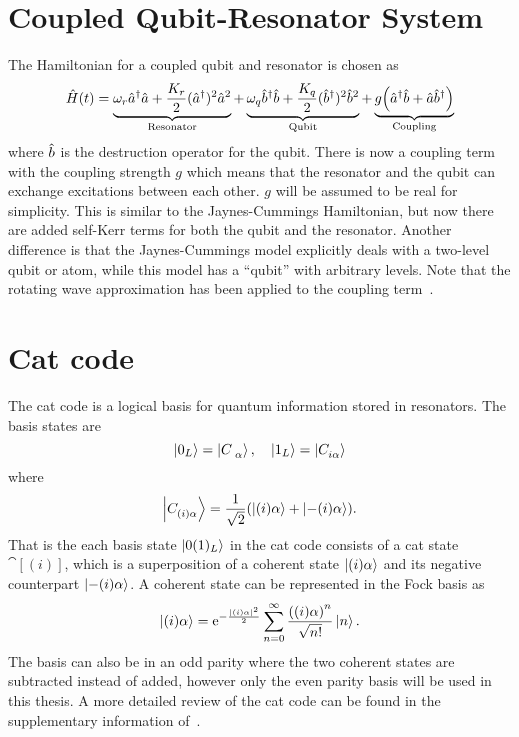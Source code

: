 \documentclass[main.tex]{subfiles}
\begin{document}
\section{Coupled Qubit-Resonator System}
The Hamiltonian for a coupled qubit and resonator is chosen as
\begin{equation}
    \Ham(t) = \underbrace{\omega_{r}\au\ad + \frac{K_r}{2}(\au)^2\ad^2}_{\text{Resonator}} + \underbrace{\omega_{q}\bu\bd + \frac{K_q}{2}(\bu)^2\bd^2}_{\text{Qubit}} + \underbrace{g\qty(\au\bd+\ad\bu)}_{\text{Coupling}}
    \label{eq:hamiltonian-coupled}
\end{equation}
where \( \bd \) is the destruction operator for the qubit.
There is now a coupling term with the coupling strength \(g\) which means that the resonator and the qubit can exchange excitations between each other.
\(g\) will be assumed to be real for simplicity.
This is similar to the Jaynes-Cummings Hamiltonian, but now there are added self-Kerr terms for both the qubit and the resonator.
Another difference is that the Jaynes-Cummings model explicitly deals with a two-level qubit or atom, while this model has a ``qubit'' with arbitrary levels.
Note that the rotating wave approximation has been applied to the coupling term~\cite{wu_strong-coupling_2007}.

\section{Cat code}
\label{sec:cat-code}
The cat code is a logical basis for quantum information stored in resonators.
The basis states are
\begin{equation}
    \ket{0_L} = \cat{},\quad \ket{1_L} = \cat[i]{}
\end{equation}
where 
\begin{equation}
    \cat[(i)]{} = \frac{1}{\sqrt{2}}\qty(\ket{(i)\alpha} + \ket{-(i)\alpha}).
\end{equation}
That is the each basis state \( \ket{0(1)_L} \) in the cat code consists of a cat state \(\cat[(i)]{}\), which is a superposition of a coherent state \(\ket{(i)\alpha}\) and its negative counterpart \(\ket{-(i)\alpha}\).
A coherent state can be represented in the Fock basis as
\begin{equation}
    \ket{(i)\alpha} =\ex^{-{\frac{|(i)\alpha|^2}{2}}}\sum_{n=0}^{\infty}{\frac{\qty((i)\alpha)^n}{\sqrt{n!}}}\ket{n}.
\end{equation}
The basis can also be in an odd parity where the two coherent states are subtracted instead of added, however only the even parity basis will be used in this thesis.
A more detailed review of the cat code can be found in the supplementary information of~\cite{ofek_extending_2016}.
\end{document}

